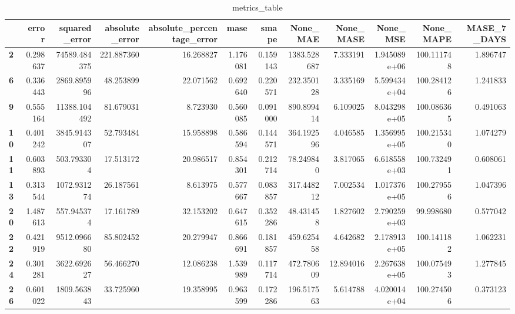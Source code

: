 \begin{table}[h]
\centering
\caption{metrics_table}
\label{table:Experiment with CNN AE and LSTM hybrid method. Local, univariate, dataset 1. Tuned with LSTM Local Univariate dataset 1}
\begin{tabular}{lrrrrrrrrrrr}
\toprule
{} &     error &  squared\_error &  absolute\_error &  absolute\_percentage\_error &      mase &     smape &     None\_MAE &  None\_MASE &      None\_MSE &   None\_MAPE &  MASE\_7\_DAYS \\
\midrule
\textbf{2 } &  0.298637 &   74589.484375 &      221.887360 &                  16.268827 &  1.176081 &  0.159143 &  1383.528687 &   7.333191 &  1.945089e+06 &  100.111748 &     1.896747 \\
\textbf{6 } &  0.336443 &    2869.895996 &       48.253899 &                  22.071562 &  0.692640 &  0.220571 &   232.350128 &   3.335169 &  5.599434e+04 &  100.284126 &     1.241833 \\
\textbf{9 } &  0.555164 &   11388.104492 &       81.679031 &                   8.723930 &  0.560085 &  0.091000 &   890.899414 &   6.109025 &  8.043298e+05 &  100.086365 &     0.491063 \\
\textbf{10} &  0.401242 &    3845.914307 &       52.793484 &                  15.958898 &  0.586594 &  0.144571 &   364.192596 &   4.046585 &  1.356995e+05 &  100.215340 &     1.074279 \\
\textbf{11} &  0.603893 &     503.793304 &       17.513172 &                  20.986517 &  0.854301 &  0.212714 &    78.249840 &   3.817065 &  6.618558e+03 &  100.732491 &     0.608061 \\
\textbf{13} &  0.313544 &    1072.931274 &       26.187561 &                   8.613975 &  0.577667 &  0.083857 &   317.448212 &   7.002534 &  1.017376e+05 &  100.279556 &     1.047396 \\
\textbf{20} &  1.487613 &     557.945374 &       17.161789 &                  32.153202 &  0.647615 &  0.352286 &    48.431458 &   1.827602 &  2.790259e+03 &   99.998680 &     0.577042 \\
\textbf{22} &  0.421919 &    9512.096680 &       85.802452 &                  20.279947 &  0.866691 &  0.181857 &   459.625458 &   4.642682 &  2.178913e+05 &  100.141182 &     1.062231 \\
\textbf{24} &  0.301281 &    3622.692627 &       56.466270 &                  12.086238 &  1.539989 &  0.117714 &   472.780609 &  12.894016 &  2.267638e+05 &  100.075493 &     1.277845 \\
\textbf{26} &  0.601022 &    1809.563843 &       33.725960 &                  19.358995 &  0.963599 &  0.172286 &   196.517563 &   5.614788 &  4.020014e+04 &  100.274506 &     0.373123 \\

\end{tabular}
\end{table}

